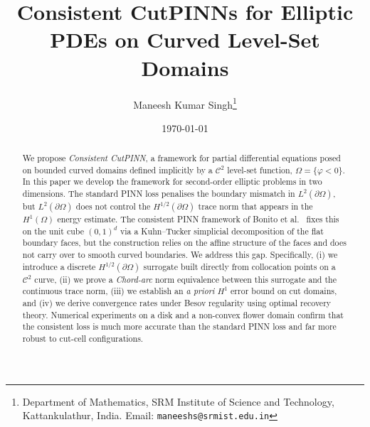 \documentclass[11pt]{article}
\title{\Large\bf  Consistent CutPINNs for Elliptic PDEs on Curved Level-Set Domains}
\author{Maneesh Kumar Singh\thanks{Department of Mathematics, SRM Institute of
Science and Technology, Kattankulathur, India. Email:
\texttt{maneeshs@srmist.edu.in}}}
\date{\today}
\newcommand{\C}{\mathcal{C}}
\begin{document}

\maketitle




\begin{abstract}
We propose \emph{Consistent CutPINN}, a framework for partial
differential equations posed on bounded curved domains defined
implicitly by a $\C^2$ level-set function, $\Omega = \{\varphi < 0\}$. In this paper we develop the framework for
second-order elliptic problems in two dimensions. The standard PINN
loss penalises the boundary mismatch in $L^2(\partial\Omega)$, but
$L^2(\partial\Omega)$ does not control the $H^{1/2}(\partial\Omega)$
trace norm that appears in the $H^1(\Omega)$ energy estimate. The
consistent PINN framework of Bonito et al.~\cite{bonito2025}
fixes this on the unit cube $(0,1)^d$ via a Kuhn--Tucker simplicial
decomposition of the flat boundary faces, but the construction relies
on the affine structure of the faces and does not carry over to
smooth curved boundaries. We address this gap. Specifically, (i) we
introduce a discrete $H^{1/2}(\partial\Omega)$ surrogate built
directly from collocation points on a $\C^2$ curve, (ii) we prove a
\textit{Chord-arc} norm equivalence between this surrogate and the continuous
trace norm, (iii) we establish an \emph{a priori} $H^1$ error
bound on cut domains, and (iv) we derive convergence rates under
Besov regularity using optimal recovery theory. Numerical experiments
on a disk and a non-convex flower domain confirm that the consistent
loss is much more accurate than the standard PINN loss and far more
robust to cut-cell configurations.
\end{abstract}
\end{document}
